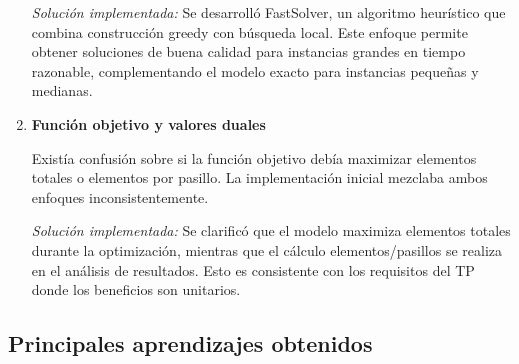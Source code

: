 \documentclass[a4paper,12pt]{article}
\begin{document}
\begin{enumerate}
    \emph{Solución implementada:} Se desarrolló FastSolver, un algoritmo heurístico que combina construcción greedy con búsqueda local. Este enfoque permite obtener soluciones de buena calidad para instancias grandes en tiempo razonable, complementando el modelo exacto para instancias pequeñas y medianas.

    \item \textbf{Función objetivo y valores duales}
    
    Existía confusión sobre si la función objetivo debía maximizar elementos totales o elementos por pasillo. La implementación inicial mezclaba ambos enfoques inconsistentemente.
    
    \emph{Solución implementada:} Se clarificó que el modelo maximiza elementos totales durante la optimización, mientras que el cálculo elementos/pasillos se realiza en el análisis de resultados. Esto es consistente con los requisitos del TP donde los beneficios son unitarios.

\end{enumerate}

\subsection*{Principales aprendizajes obtenidos}
\end{document}
